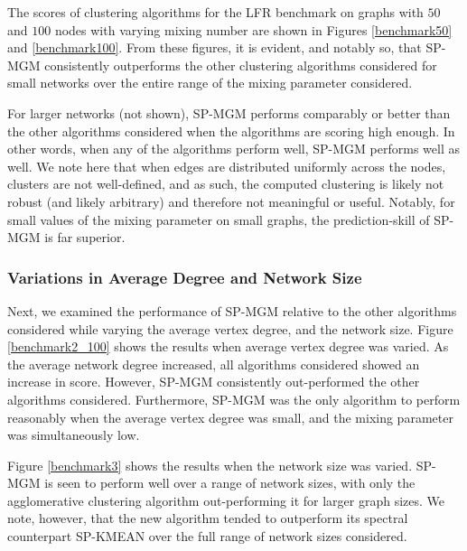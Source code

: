 \documentclass[10pt,journal,compsoc]{IEEEtran} %
\theoremstyle{definition}
\begin{document}
The scores of clustering algorithms for the LFR benchmark on graphs
with $50$ and $100$ nodes with varying mixing number are shown in
Figures \ref{benchmark50} and \ref{benchmark100}.  From these figures,
it is evident, and notably so, that SP-MGM consistently outperforms
the other clustering algorithms considered for small networks over the
entire range of the mixing parameter considered.

For larger networks (not shown), SP-MGM performs comparably or better
than the other algorithms considered when the algorithms are scoring
high enough.  In other words, when any of the algorithms perform well,
SP-MGM performs well as well. We note here that when edges are
distributed uniformly across the nodes, clusters are not well-defined,
and as such, the computed clustering is likely not robust (and likely
arbitrary) and therefore not meaningful or useful. Notably, for small
values of the mixing parameter on small graphs, the prediction-skill
of SP-MGM is far superior.

\subsubsection{Variations in Average Degree and Network Size}

Next, we examined the performance of SP-MGM relative to the other
algorithms considered while varying the average vertex degree, and the
network size.  Figure \ref{benchmark2_100} shows the results when
average vertex degree was varied. As the average network degree
increased, all algorithms considered showed an increase in score.
However, SP-MGM consistently out-performed the other algorithms
considered.  Furthermore, SP-MGM was the only algorithm to perform
reasonably when the average vertex degree was small, and the mixing
parameter was simultaneously low.

Figure \ref{benchmark3} shows the results when the network size was
varied. SP-MGM is seen to perform well over a range of network sizes,
with only the agglomerative clustering algorithm out-performing it for
larger graph sizes.  We note, however, that the new algorithm tended
to outperform its spectral counterpart SP-KMEAN over the full range of
network sizes considered.
\end{document}
